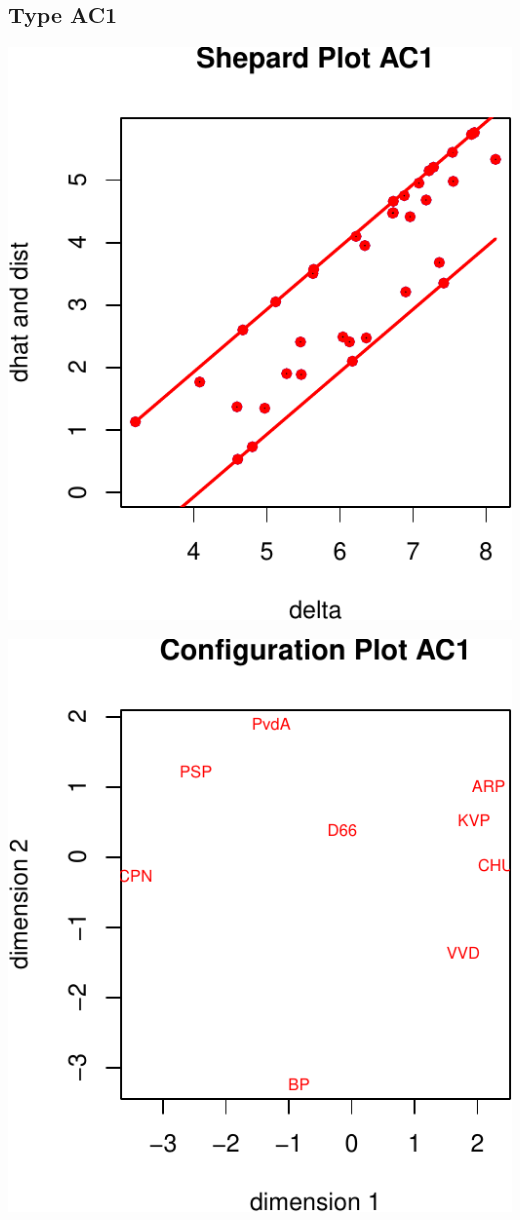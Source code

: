 \documentclass[
  12pt,
]{article}
\begin{document}
\subsection{Type AC1}\label{type-ac1-1}

\begin{center}\includegraphics{smacofAC_files/figure-latex/gruijterh11-1} \end{center}

\begin{center}\includegraphics{smacofAC_files/figure-latex/gruijterh11-2} \end{center}
\end{document}
